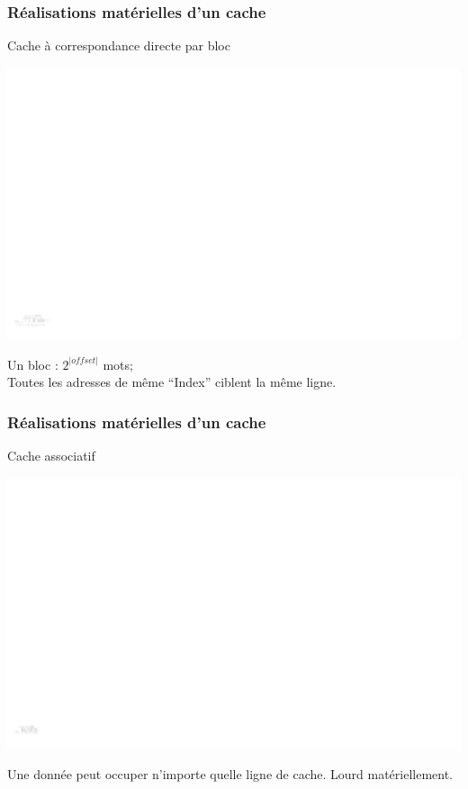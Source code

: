 \documentclass{beamer}
\begin{document}
\begin{frame}
\frametitle{Réalisations matérielles d'un cache}
\begin{block}{Cache à correspondance directe par bloc}

\includegraphics[width=\linewidth]{Figs/direct_cache_block.pdf}

\end{block}

Un bloc : $2^{|offset|}$ mots;\\
Toutes les adresses de même ``Index'' ciblent la même ligne.
\end{frame}

\begin{frame}
\frametitle{Réalisations matérielles d'un cache}
\begin{block}{Cache associatif}

\centering\includegraphics[width=\linewidth]{Figs/associatif_cache.pdf}

\end{block}

Une donnée peut occuper n'importe quelle ligne de cache. Lourd matériellement.

\end{frame}
\end{document}
